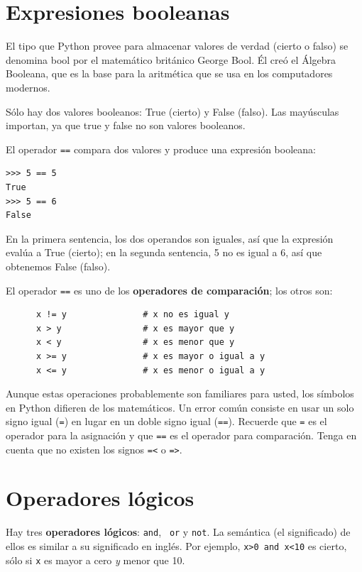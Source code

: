 \section{Expresiones booleanas}

El tipo que Python provee para almacenar valores de verdad (cierto o falso)
se denomina bool por el matemático británico George Bool. Él creó el
Álgebra Booleana, que es la base para la aritmética que se usa en 
los computadores modernos.

Sólo hay dos valores booleanos: True (cierto) y False (falso). Las mayúsculas importan, ya que true y false no son valores booleanos.


El operador \texttt{==} compara dos valores y produce una expresión  booleana:

\beforeverb
\begin{verbatim}
>>> 5 == 5
True
>>> 5 == 6
False
\end{verbatim}
\afterverb
%
En la primera sentencia, los dos operandos son iguales, así que la expresión
evalúa a True (cierto); en la segunda sentencia, 5 no es igual a 6, así que
obtenemos False (falso).

El operador \texttt{==} es uno de los  {\bf operadores de comparación}; los 
otros son:

\beforeverb
\begin{verbatim}
      x != y               # x no es igual y
      x > y                # x es mayor que y
      x < y                # x es menor que y
      x >= y               # x es mayor o igual a y
      x <= y               # x es menor o igual a y
\end{verbatim}
\afterverb
%
Aunque estas operaciones probablemente son familiares para usted, los
símbolos en Python difieren de los matemáticos. Un error común consiste
en usar un solo signo igual (\texttt{=}) en lugar en un doble signo igual
(\texttt{==}).  Recuerde que \texttt{=} es el operador para la asignación y que
\texttt{==} es el operador para comparación.  Tenga en cuenta que
no existen los signos \texttt{=<} o \texttt{=>}.


\section {Operadores lógicos}

Hay tres  {\bf operadores lógicos}: \texttt{and}, {\tt
or} y \texttt{not}.  La semántica (el significado) de ellos es similar
a su significado en inglés.  Por ejemplo,
\texttt{x>0 and x<10} es cierto, sólo si  \texttt{x} es mayor a cero
{\em y} menor que 10.

